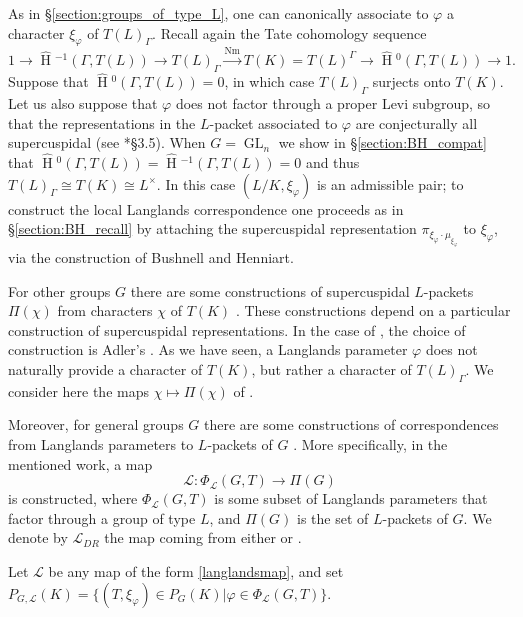 \documentclass{mrlart7}
\theoremstyle{plain}
\newcommand{\HT}[1]{\hat{\HH}{}^{#1}}
\theoremstyle{definition}
\numberwithin{equation}{section}
\DeclareMathOperator{\HH}{H}
\DeclareMathOperator{\Nm}{Nm}
\DeclareMathOperator{\GL}{GL}
\newcommand{\Lx}{L^\times}
\newcommand{\Lpack}{\mathcal{L}}
\begin{document}
As in \S\ref{section:groups_of_type_L}, one can canonically
associate to $\varphi$ a character $\xi_{\varphi}$ of $T(L)_{\Gamma}$.
Recall again the Tate cohomology sequence
$$1 \rightarrow \HT{-1}(\Gamma,T(L)) \rightarrow T(L)_{\Gamma} \xrightarrow{\Nm} T(K)
= T(L)^{\Gamma} \rightarrow \HT{0}(\Gamma,T(L)) \rightarrow 1.$$
Suppose that $\HT{0}(\Gamma, T(L)) = 0$, in which case
$T(L)_{\Gamma}$ surjects onto $T(K)$.  Let us also suppose that
$\varphi$ does not factor through a proper Levi subgroup, so that the
representations in the $L$-packet associated to $\varphi$ are
conjecturally all supercuspidal (see \cite{reeder-debacker:09a}*{\S 3.5}).
When $G = \GL_n$ we show in \S\ref{section:BH_compat} that
$\HT{0}(\Gamma, T(L)) = \HT{-1}(\Gamma, T(L)) = 0$ and thus
$T(L)_{\Gamma} \cong T(K) \cong \Lx$.  In this case
$(L/K, \xi_{\varphi})$ is an admissible pair; to construct the local Langlands
correspondence one proceeds as in \S\ref{section:BH_recall} by
attaching the supercuspidal representation $\pi_{\xi_{\varphi} \cdot
  \mu_{\xi_{\varphi}}}$ to $\xi_{\varphi}$, via the construction of Bushnell and Henniart.

For other groups $G$ there are some constructions of supercuspidal $L$-packets $\Pi(\chi)$
from characters $\chi$ of $T(K)$ \cites{reeder-debacker:09a, kaletha:13a, reeder:08a}.
These constructions depend on a particular construction of supercuspidal representations.
In the case of \cites{kaletha:13a, reeder:08a}, the choice of construction is Adler's \cite{adler:98a}.
As we have seen, a Langlands parameter $\varphi$ does not naturally
provide a character of $T(K)$, but rather a character of
$T(L)_{\Gamma}$.  We consider here the maps $\chi \mapsto \Pi(\chi)$ of \cites{reeder-debacker:09a, reeder:08a}.

Moreover, for general groups $G$ there are some constructions of correspondences from Langlands
parameters to $L$-packets of $G$ \cites{reeder-debacker:09a, kaletha:13a, reeder:08a}.
More specifically, in the mentioned work, a map
\begin{equation}\label{langlandsmap}
\Lpack: \Phi_{\Lpack}(G, T) \rightarrow \Pi(G)
\end{equation}
is constructed, where $\Phi_{\Lpack}(G, T)$ is some subset of Langlands parameters that
factor through a group of type $L$, and $\Pi(G)$ is the set of $L$-packets of $G$.
We denote by $\Lpack_{DR}$ the map coming from either \cite{reeder-debacker:09a} or \cite{reeder:08a}.

Let $\Lpack$ be any map of the form \eqref{langlandsmap}, and set
$P_{G, \Lpack}(K) = \{ (T, \xi_{\varphi}) \in P_G(K) | \varphi \in \Phi_{\Lpack}(G, T) \}$.
\end{document}
